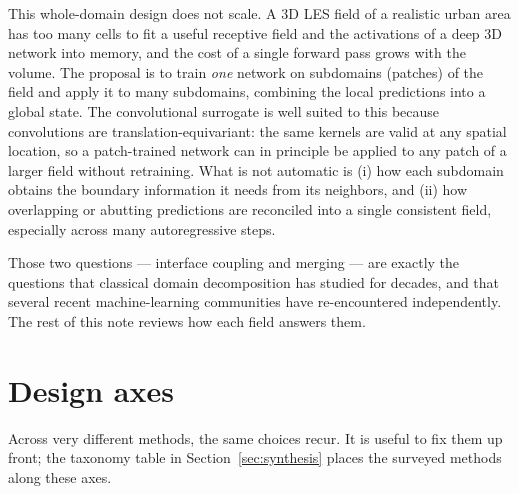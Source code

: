 \documentclass[11pt]{article}
\begin{document}
This whole-domain design does not scale. A 3D LES field of a realistic urban
area has too many cells to fit a useful receptive field and the activations of a
deep 3D network into memory, and the cost of a single forward pass grows with
the volume. The proposal is to train \emph{one} network on subdomains (patches)
of the field and apply it to many subdomains, combining the local predictions
into a global state. The convolutional surrogate is well suited to this because
convolutions are translation-equivariant: the same kernels are valid at any
spatial location, so a patch-trained network can in principle be applied to any
patch of a larger field without retraining. What is not automatic is (i) how
each subdomain obtains the boundary information it needs from its neighbors, and
(ii) how overlapping or abutting predictions are reconciled into a single
consistent field, especially across many autoregressive steps.

Those two questions --- interface coupling and merging --- are exactly the
questions that classical domain decomposition has studied for decades, and that
several recent machine-learning communities have re-encountered independently.
The rest of this note reviews how each field answers them.

\section{Design axes}\label{sec:axes}

Across very different methods, the same choices recur. It is useful to fix them
up front; the taxonomy table in Section~\ref{sec:synthesis} places the surveyed
methods along these axes.
\end{document}
